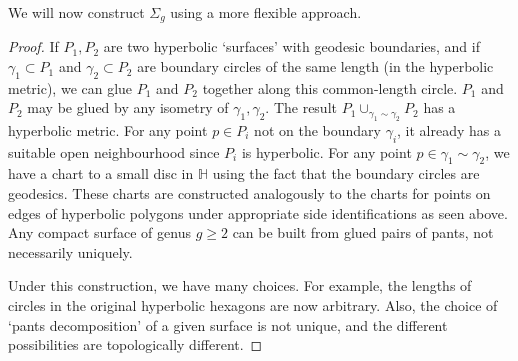 We will now construct \( \Sigma_g \) using a more flexible approach.
\begin{proof}
	If \( P_1, P_2 \) are two hyperbolic `surfaces' with geodesic boundaries, and if \( \gamma_1 \subset P_1 \) and \( \gamma_2 \subset P_2 \) are boundary circles of the same length (in the hyperbolic metric), we can glue \( P_1 \) and \( P_2 \) together along this common-length circle.
	\( P_1 \) and \( P_2 \) may be glued by any isometry of \( \gamma_1, \gamma_2 \).
	The result \( P_1 \cup_{\gamma_1 \sim \gamma_2} P_2 \) has a hyperbolic metric.
	For any point \( p \in P_i \) not on the boundary \( \gamma_i \), it already has a suitable open neighbourhood since \( P_i \) is hyperbolic.
	For any point \( p \in \gamma_1 \sim \gamma_2 \), we have a chart to a small disc in \( \mathbb H \) using the fact that the boundary circles are geodesics.
	These charts are constructed analogously to the charts for points on edges of hyperbolic polygons under appropriate side identifications as seen above.
	Any compact surface of genus \( g \geq 2 \) can be built from glued pairs of pants, not necessarily uniquely.

	Under this construction, we have many choices.
	For example, the lengths of circles in the original hyperbolic hexagons are now arbitrary.
	Also, the choice of `pants decomposition' of a given surface is not unique, and the different possibilities are topologically different.
\end{proof}

